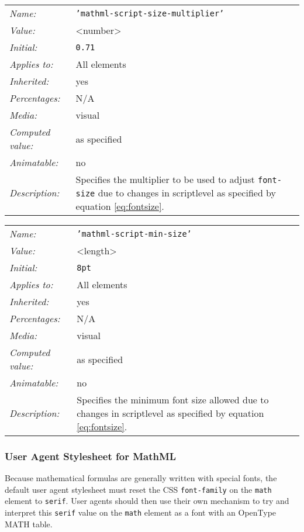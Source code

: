 \begin{table}
\begin{tabular}{ll}
  \emph{Name:} & {\tt 'mathml-script-size-multiplier'} \\
  \emph{Value:} & \textless number\textgreater \\
  \emph{Initial:} & {\tt 0.71} \\
  \emph{Applies to:} & All elements \\
  \emph{Inherited:} & yes \\
  \emph{Percentages:} & N/A \\
  \emph{Media:} & visual \\
  \emph{Computed value:} & as specified \\
  \emph{Animatable:} & no \\
  \emph{Description:} & Specifies the multiplier to be used to adjust
       {\tt font-size} due to changes in scriptlevel as specified by equation
       \ref{eq:fontsize}.
\end{tabular}
\label{tab:CSSScriptSizeMultiplier}
\end{table}

\begin{table}
\begin{tabular}{ll}
  \emph{Name:} & {\tt 'mathml-script-min-size'} \\
  \emph{Value:} & \textless length\textgreater \\
  \emph{Initial:} & {\tt 8pt} \\
  \emph{Applies to:} & All elements \\
  \emph{Inherited:} & yes \\
  \emph{Percentages:} & N/A \\
  \emph{Media:} & visual \\
  \emph{Computed value:} & as specified \\
  \emph{Animatable:} & no \\
  \emph{Description:} & Specifies the minimum font size allowed due to changes
  in scriptlevel as specified by equation \ref{eq:fontsize}.
\end{tabular}
\label{tab:CSSScriptSizeMinSize}
\end{table}

\subsubsection{User Agent Stylesheet for MathML}\label{UAStylesheet}

Because mathematical formulas are generally written with special fonts, the
default user agent stylesheet must reset the CSS {\tt font-family} on the
{\tt math} element to {\tt serif}. User agents should then use their own
mechanism to try and interpret this {\tt serif} value on the {\tt math} element
as a font with an OpenType MATH table.

